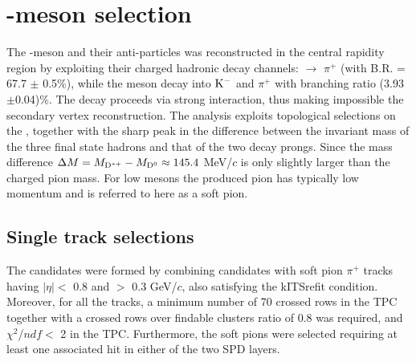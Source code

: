 \linenumbers

\section{\Dstar -meson selection}
The \Dstar -meson and their anti-particles was reconstructed in the central rapidity region by exploiting their charged hadronic decay channels: \Dstar $\rightarrow$ \Dzero$\pi^{+}$ (with B.R. = 67.7 $\pm$ 0.5$\%$), while the \Dzero meson decay into $\rm K^-$ and $\pi^{+}$ with branching ratio (3.93$\pm$0.04)\%. The \Dstar decay proceeds via strong interaction, thus making impossible the secondary vertex reconstruction. The analysis exploits topological selections on the \Dzero,  together with the sharp peak in the difference between the invariant mass of the three final state hadrons and that of the two \Dzero decay prongs. Since the mass difference $\Delta M = M_{\rm D^{\ast +}} - M_{\rm D^0} \approx 145.4$ MeV/$c$ is only slightly larger than the charged pion mass. For low \pt \Dstar mesons the produced pion has typically low momentum and is referred to here as a soft pion.



\subsection{Single track selections}
\label{sec:single_track}

The \Dstar candidates were formed by combining \Dzero candidates with soft pion $\pi^{+}$ tracks having $|\eta| <$ 0.8 and \pt $>$ 0.3 GeV/$c$, also satisfying the kITSrefit condition. Moreover, for all the tracks, a minimum number of 70 crossed rows in the TPC together with a crossed rows over findable clusters ratio of 0.8 was required, and $\chi^2$/$ndf <$ 2 in the TPC. Furthermore, the \Dstar soft pions were selected requiring at least one associated hit in either of the two SPD layers. 


